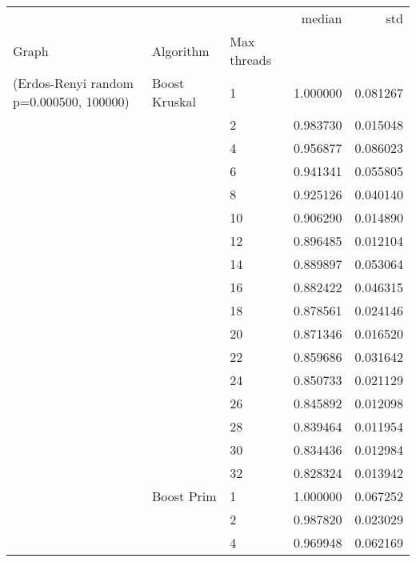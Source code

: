\begin{tabular}{lllrr}
\toprule
                       &                    &    &    median &       std \\
Graph & Algorithm & Max threads &           &           \\
\midrule
(Erdos-Renyi random p=0.000500, 100000) & Boost Kruskal & 1  &  1.000000 &  0.081267 \\
                       &                    & 2  &  0.983730 &  0.015048 \\
                       &                    & 4  &  0.956877 &  0.086023 \\
                       &                    & 6  &  0.941341 &  0.055805 \\
                       &                    & 8  &  0.925126 &  0.040140 \\
                       &                    & 10 &  0.906290 &  0.014890 \\
                       &                    & 12 &  0.896485 &  0.012104 \\
                       &                    & 14 &  0.889897 &  0.053064 \\
                       &                    & 16 &  0.882422 &  0.046315 \\
                       &                    & 18 &  0.878561 &  0.024146 \\
                       &                    & 20 &  0.871346 &  0.016520 \\
                       &                    & 22 &  0.859686 &  0.031642 \\
                       &                    & 24 &  0.850733 &  0.021129 \\
                       &                    & 26 &  0.845892 &  0.012098 \\
                       &                    & 28 &  0.839464 &  0.011954 \\
                       &                    & 30 &  0.834436 &  0.012984 \\
                       &                    & 32 &  0.828324 &  0.013942 \\
                       & Boost Prim & 1  &  1.000000 &  0.067252 \\
                       &                    & 2  &  0.987820 &  0.023029 \\
                       &                    & 4  &  0.969948 &  0.062169 \\

\end{tabular}
